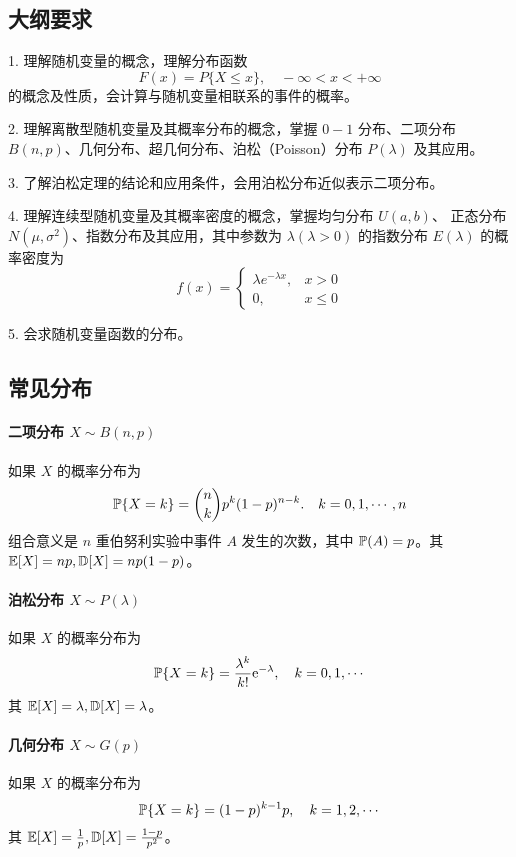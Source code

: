 \subsection{大纲要求}

1. 理解随机变量的概念，理解分布函数
\[ F(x) = P\{X \leqslant x\}, \quad -\infty < x < +\infty \]
的概念及性质，会计算与随机变量相联系的事件的概率。

2. 理解离散型随机变量及其概率分布的概念，掌握 $0-1$ 分布、二项分布 $B(n, p)$、几何分布、超几何分布、泊松（Poisson）分布 $P(\lambda)$ 及其应用。

3. 了解泊松定理的结论和应用条件，会用泊松分布近似表示二项分布。

4. 理解连续型随机变量及其概率密度的概念，掌握均匀分布 $U(a, b)$、 正态分布 $N(\mu, \sigma^2)$、指数分布及其应用，其中参数为 $\lambda(\lambda > 0)$ 的指数分布 $E(\lambda)$ 的概率密度为
\[ f(x) = \begin{cases} \lambda e^{-\lambda x}, & x > 0 \\ 0, &x \leqslant 0 \end{cases} \]

5. 会求随机变量函数的分布。

\subsection{常见分布}

\paragraph{二项分布 $X \sim B(n, p)$}
如果 $X$ 的概率分布为
\[ \mathbb{P}\{X = k\} = \binom{n}{k} p^k(1 - p)^{n-k}. \quad k = 0, 1, \cdots, n \]
组合意义是 $n$ 重伯努利实验中事件 $A$ 发生的次数，其中 $\mathbb{P}(A) = p$。其 $\mathbb{E} [X] = np, \mathbb{D} [X] = np(1-p)$。

\paragraph{泊松分布 $X \sim P(\lambda)$}
如果 $X$ 的概率分布为
\[ \mathbb{P}\{X = k\} = \frac{\lambda^k}{k!} \mathrm{e}^{-\lambda} , \quad k = 0, 1, \cdots \]
其 $\mathbb{E} [X] = \lambda, \mathbb{D} [X] = \lambda$。


\paragraph{几何分布 $X \sim G(p)$}
如果 $X$ 的概率分布为
\[ \mathbb{P}\{X=k\} = (1 - p)^{k-1}p, \quad k = 1, 2, \cdots \]
其 $\mathbb{E} [X] = \frac{1}{p}, \mathbb{D} [X] = \frac{1-p}{p^2}$。

